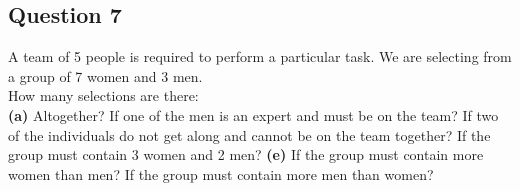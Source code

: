 \documentclass[12pt]{article}
\begin{document}
\subsection*{Question 7}
A team of 5 people is required to perform a particular task. We are selecting from a group of 7 women and 3 men.\\[0.2cm]
How many selections are there:\\[-0.2cm]

{\bf(a)} Altogether?  If one of the men is an expert and must be on the team?  If two of the individuals do not get along and cannot be on the team together?  If the group must contain 3 women and 2 men? {\bf(e)} If the group must contain more women than men?  If the group must contain more men than women?
\end{document}
